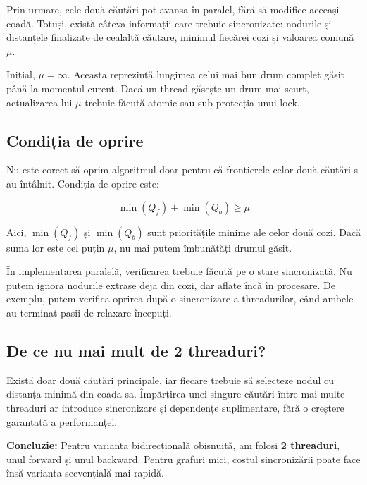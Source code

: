 \documentclass[12pt,a4paper]{article}
\begin{document}
Prin urmare, cele două căutări pot avansa
în paralel, fără să modifice aceeași coadă.
Totuși, există câteva informații care trebuie
sincronizate: nodurile și distanțele finalizate
de cealaltă căutare, minimul fiecărei cozi și
valoarea comună $\mu$.

Inițial, $\mu = \infty$. Aceasta reprezintă
lungimea celui mai bun drum complet găsit
până la momentul curent. Dacă un thread găsește
un drum mai scurt, actualizarea lui $\mu$
trebuie făcută atomic sau sub protecția
unui lock.

\subsection*{Condiția de oprire}

Nu este corect să oprim algoritmul doar
pentru că frontierele celor două căutări
s-au întâlnit. Condiția de oprire este:

\[
\boxed{\min(Q_f) + \min(Q_b) \geq \mu}
\]

Aici, $\min(Q_f)$ și $\min(Q_b)$ sunt
prioritățile minime ale celor două cozi.
Dacă suma lor este cel puțin $\mu$,
nu mai putem îmbunătăți drumul găsit.

În implementarea paralelă, verificarea
trebuie făcută pe o stare sincronizată.
Nu putem ignora nodurile extrase deja din
cozi, dar aflate încă în procesare. De
exemplu, putem verifica oprirea după o
sincronizare a threadurilor, când ambele
au terminat pașii de relaxare începuți.

\subsection*{De ce nu mai mult de 2 threaduri?}

Există doar două căutări principale, iar
fiecare trebuie să selecteze nodul cu
distanța minimă din coada sa. Împărțirea
unei singure căutări între mai multe threaduri
ar introduce sincronizare și dependențe
suplimentare, fără o creștere garantată
a performanței.

\textbf{Concluzie:} Pentru varianta
bidirecțională obișnuită, am folosi
\textbf{2 threaduri}, unul forward și
unul backward. Pentru grafuri mici,
costul sincronizării poate face însă
varianta secvențială mai rapidă.
\end{document}
